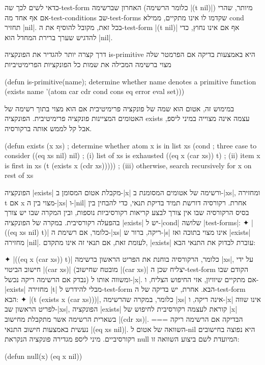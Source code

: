 כדאי לשים לכך שה-test-form האחרון שברשימה (כלומר הרשימה \T|(t nil)|) מיותר,
שהרי אם אף אחד מה-test-conditions שב-test-forms שקדמו לו אינו מתקיים, ממילא
cond תחזיר \E|nil|. בכל זאת, מקובל להוסיף את ה-test-form \T|(t nil)| אף אם אינו
נחוץ, כדי להדגיש שערך ברירת המחדל הוא \E|nil|.

דרך קצרה יותר להגדיר את הפונקציה is-primitive היא באמצעות בדיקה אם הפרמטר
שלה מצוי ברשימה המכילה את שמות כל הפונקציות הפרימיטיביות
\begin{KERNEL}
(defun is-primitive(name); determine whether name denotes a primitive function
  (exists name '(atom car cdr cond cons eq error eval set)))
\end{KERNEL}
במימוש זה, אטום הוא שמה של פונקציה פרימיטיבית אם הוא מצוי בתוך רשימה של האטומים
המציינות פונקציה פרימיטיבית. הפונקציה exists עצמה אינה מצוייה במיני ליספ, אבל
קל לממש אותה ברקורסיה.
\begin{LISP}
(defun exists (x xs) ; determine whether atom x is in list xs
  (cond ; three case to consider
    ((eq xs nil) nil) ; (i) list of xs is exhausted
    ((eq x (car xs)) t) ; (ii) item x is first in xs
    (t (exists x (cdr xs))))) ; (iii) otherwise, search recursively for x on rest of xs
\end{LISP}
הפונקציה \T|exists| מקבלת אטום המסומן ב-\T|x| ורשימה של אטומים המסומנת
ב-\T|xs|, ומחזירה t אם x מצוי בין ה-\T|xs| ו-\T|nil| אחרת. רקורסיה דורשת תמיד
בדיקת תנאי, כדי להבחין בין בסיס הרקורסיה שבו אין צורך לבצע קריאות רקורסיביות
נוספות, ובין המקרה שבו יש צורך בהפעלה רקורסיבית. במקרה של הפונקציה \T|exists|
יש ל-\T|cond| שלושה \E|test-forms|:
✦ \T|((eq xs nil) t)| כלומר, אם רשימת ה-\T|xs| ריקה, ברור ש-\T|s| אינו מצוי
בתוכה ואז \T|exists| מחזירה \T|nil|. לעומת זאת, אם תנאי זה אינו מתקדם,
\T|exists| עוברת לבדוק את התנאי הבא:

✦ \T|((eq x (car xs)) t)| כלומר, הרקורסיה בוחנת את הפריט הראשון ברשימה \T|xs|,
על ידי חישוב הביטוי \T|(car xs)| (מובטח שחישוב \T|(car xs)| יצליח שכן
ה-test-form הקודם שבו נבדק אם הרשימה ריקה נכשל) ומשווה אותו ל-\T|x|. אם מתקיים
שיוויון, אזי החיפוש הצליח, ו-\T|exists| מחזירה \T|t| מבלי להידרש ל-test-form
הבא. אחרת, יש בדיקה של ה-test-form הבא:
✦ \T|(t (exists x (car xs)))|, כלומר, במקרה שהרשימה \T|xs| אינה ריקה, ו-\T|x|
אינו שווה לפריט הראשון שב-\T|xs|, הפונקציה \T|exists| קוראת לעצמה רקורסיבית לחיפוש של
\T|x| בשארית הרשימה אשר מתקבלת מחישוב \T|(cdr xs)|.
===
הבדיקה אם הרשימה ריקה נעשית באמצעות חישוב התנאי \T|(eq xs nil)|. השוואה של
אטום ל-nil היא נפוצה בחישובים רקורסיביים. מיני ליספ מגדירה פונקציה הנקראת null
המיועדת לשם ביצוע השוואה זו:
\begin{LIBRARY}
(defun null(x) (eq x nil))
\end{LIBRARY}

